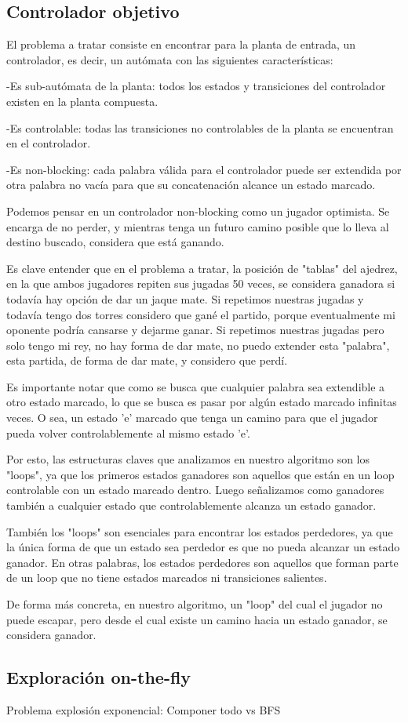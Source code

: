 \subsection{Controlador objetivo}
El problema a tratar consiste en encontrar para la planta de entrada, un controlador, es decir, un autómata con las siguientes características:

	-Es sub-autómata de la planta: todos los estados y transiciones del controlador existen en la planta compuesta.
	
	-Es controlable: todas las transiciones no controlables de la planta se encuentran en el controlador.
	
	-Es non-blocking: cada palabra válida para el controlador puede ser extendida por otra palabra no vacía para que su concatenación alcance un estado marcado.
	
Podemos pensar en un controlador non-blocking como un jugador optimista. Se encarga de no perder, y mientras tenga un futuro camino posible que lo lleva al destino buscado, considera que está ganando.

Es clave entender que en el problema a tratar, la posición de "tablas" del ajedrez, en la que ambos jugadores repiten sus jugadas 50 veces, se considera ganadora si todavía hay opción de dar un jaque mate. Si repetimos nuestras jugadas y todavía tengo dos torres considero que gané el partido, porque eventualmente mi oponente podría cansarse y dejarme ganar. Si repetimos nuestras jugadas pero solo tengo mi rey, no hay forma de dar mate, no puedo extender esta "palabra", esta partida, de forma de dar mate, y considero que perdí.

Es importante notar que como se busca que cualquier palabra sea extendible a otro estado marcado, lo que se busca es pasar por algún estado marcado infinitas veces. O sea, un estado 'e' marcado que tenga un camino para que el jugador pueda volver controlablemente al mismo estado 'e'.

Por esto, las estructuras claves que analizamos en nuestro algoritmo son los "loops", ya que los primeros estados ganadores son aquellos que están en un loop controlable con un estado marcado dentro. Luego señalizamos como ganadores también a cualquier estado que controlablemente alcanza un estado ganador.

También los "loops" son esenciales para encontrar los estados perdedores, ya que la única forma de que un estado sea perdedor es que no pueda alcanzar un estado ganador. En otras palabras, los estados perdedores son aquellos que forman parte de un loop que no tiene estados marcados ni transiciones salientes.

De forma más concreta, en nuestro algoritmo, un "loop" del cual el jugador no puede escapar, pero desde el cual existe un camino hacia un estado ganador, se considera ganador.
\\

\subsection{Exploración on-the-fly}
Problema explosión exponencial: Componer todo vs BFS
\\



















